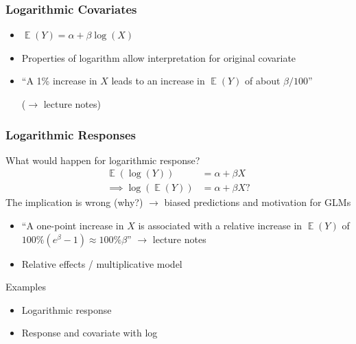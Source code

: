 \documentclass[
    utf8,
    aspectratio=169
]{beamer}  %
\DeclareMathOperator{\E}{\mathbb{E}}  %
\begin{document}
\begin{frame}
	\frametitle{Logarithmic Covariates}
	\begin{itemize}
		\item $\E(Y) = \alpha + \beta\log(X)$
		\item Properties of logarithm allow interpretation \alert{for original covariate}
		\item ``A 1\% increase in $X$ leads to an increase in $\E(Y)$ of about $\beta/100$''
		
		($\rightarrow$ lecture notes)
		
		\vfill
		
		\begin{example}
		\end{example}
	\end{itemize}
\end{frame}

\begin{frame}
	\frametitle{Logarithmic Responses}
	What would happen for logarithmic response?
	\begin{align*}
		\E(\log(Y)) &= \alpha + \beta X \\
		\implies \log(\E(Y)) &= \alpha + \beta X?
	\end{align*}
	The implication is wrong (why?) $\rightarrow$ biased predictions and motivation for GLMs
	
	\begin{itemize}
		\item ``A one-point increase in $X$ is associated with a relative increase in $\E(Y)$ of $100\%(e^\beta - 1)\approx 100\% \beta$''
		$\rightarrow$ lecture notes
		\item Relative effects / multiplicative model
	\end{itemize}
	
	\begin{exampleblock}{Examples}
		\begin{itemize}
			\item Logarithmic response
			\item Response and covariate with log
		\end{itemize}
	\end{exampleblock}
\end{frame}
\end{document}

